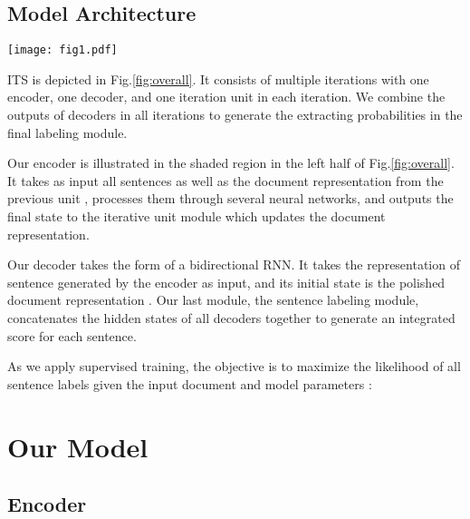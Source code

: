 \documentclass[11pt,a4paper]{article}
\begin{document}
\subsection{Model Architecture}

\begin{figure*}
	\setlength{\abovecaptionskip}{0.cm}
	
	\setlength{\belowcaptionskip}{-0.cm}
	\texttt{[image: fig1.pdf]}
	\caption{\label{fig:overall} Model Structure: There is one encoder, one decoder and one iterative unit  (which is used to polish document representation) in each iteration. The final labeling part is used to generating the extracting probabilities for all sentences combining hidden states of decoders in all iterations. We take a document consists of three sentences for example here. }
\end{figure*}

ITS is depicted in Fig.\ref{fig:overall}. It consists of multiple iterations with one encoder, one decoder, and one iteration unit in each iteration. We combine the outputs of decoders in all iterations to generate the extracting probabilities in the final labeling module.

Our encoder is illustrated in the shaded region in the left half of Fig.\ref{fig:overall}. It takes as input all sentences as well as the document representation from the previous unit , processes them through several neural networks, and outputs the final state to the iterative unit module which updates the document representation. 

Our decoder takes the form of a bidirectional RNN. It takes the representation of sentence generated by the encoder as input, and its initial state is the polished document representation . 
Our last module, the sentence labeling module, concatenates the hidden states of all decoders together to generate an integrated score for each sentence.

As we apply supervised training, the objective is to maximize the likelihood of all sentence labels  given the input document  and model parameters :





\section{Our Model}

\subsection{Encoder}
\end{document}
